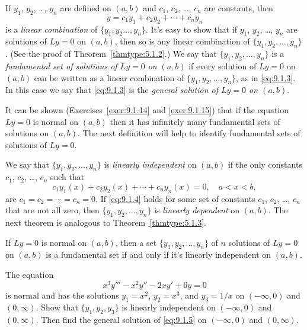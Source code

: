 If $y_{1}$, $y_{2}$, \dots, $y_{n}$ are defined on $(a,b)$ and $c_{1}$, $c_{2}$, \dots, $c_{n}$ are
constants, then
\begin{equation}
  \label{eq:9.1.3}y=c_{1}y_{1}+c_{2}y_{2}+\cdots+c_{n}y_{n}
\end{equation}
is a {\color{blue}\it linear combination\/} of $\{y_{1},y_{2}\dots,y_{n}\}$. It's easy to show that
if $y_{1}$, $y_{2}$, \dots, $y_{n}$ are solutions of $Ly=0$ on $(a,b)$, then so is any linear
combination of $\{y_{1},y_{2},\dots,y_{n}\}$. (See the proof of Theorem~\ref{thmtype:5.1.2}.) We say
that $\{y_{1},y_{2},\dots,y_{n}\}$ is a {\color{blue}\it fundamental set of solutions of $Ly=0$
on\/} $(a,b)$ if every solution of $Ly=0$ on $(a,b)$ can be written as a linear combination of
$\{y_{1},y_{2},\dots,y_{n}\}$, as in \eqref{eq:9.1.3}. In this case we say that \eqref{eq:9.1.3} is
the {\color{blue}\it general solution of $Ly=0$ on $(a,b)$\/}.

It can be shown (Exercises~\ref{exer:9.1.14} and \ref{exer:9.1.15}) that if the equation $Ly=0$ is
normal on $(a,b)$ then it has infinitely many fundamental sets of solutions on $(a,b)$. The next
definition will help to identify fundamental sets of solutions of $Ly=0$.

We say that $\{y_{1},y_{2},\dots,y_{n}\}$ is {\color{blue}\it linearly independent\/} on $(a,b)$ if
the only constants $c_{1}$, $c_{2}$, \dots, $c_{n}$ such that
\begin{equation}
  \label{eq:9.1.4}c_{1}y_{1}(x)+c_{2}y_{2}(x)+\cdots+c_{n}y_{n}(x)=0,\quad a<x<b,
\end{equation}
are $c_{1}=c_{2}=\cdots=c_{n}=0$. If \eqref{eq:9.1.4} holds for some set of constants $c_{1}$,
$c_{2}$, \dots, $c_{n}$ that are not all zero, then $\{y_{1},y_{2},\dots,y_{n}\}$ is
{\color{blue}\it linearly dependent\/} on $(a,b)$. The next theorem is analogous to Theorem~\ref{thmtype:5.1.3}.

\begin{theorem}
  \color{blue}
  \label{thmtype:9.1.2} If $Ly=0$ is normal on $(a,b)$, then a set $\{y_{1},y_{2},\dots,y_{n}\}$ of
  $n$ solutions of $Ly=0$ on $(a,b)$ is a fundamental set if and only if it's linearly independent
  on $(a,b)$.
\end{theorem}

\begin{example}
  \label{example:9.1.1}\rm The equation
  \begin{equation}
    \label{eq:9.1.5}x^{3}y'''-x^{2}y''-2xy'+6y=0
  \end{equation}
  is normal and has the solutions $y_{1}=x^{2}$, $y_{2}=x^{3}$, and $y_{3}=1/x$ on $(-\infty,0)$ and
  $(0,\infty)$. Show that $\{y_{1},y_{2},y_{3}\}$ is linearly independent on $(-\infty,0)$ and
  $(0,\infty)$. Then find the general solution of \eqref{eq:9.1.5} on $(-\infty,0)$ and
  $(0,\infty)$.
\end{example}

